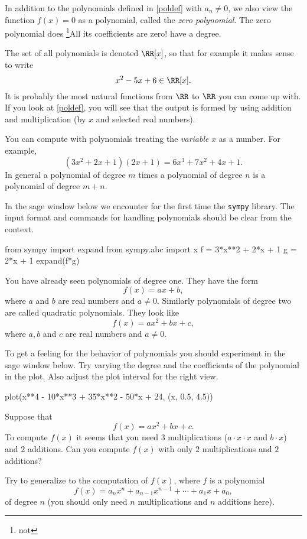 \documentclass{article}
\begin{document}
In addition to the polynomials defined in \eqref{poldef} with $a_n\neq 0$,
we also view the function $f(x) = 0$ as a polynomial, called the \emph{zero polynomial}.
The zero polynomial does \footnote{not}{All its coefficients are zero!} have a degree.

The set of all polynomials is denoted
$\RR[x]$, so that for example it makes sense to write
$$
x^2 - 5 x + 6\in \RR[x].
$$
It is probably the most natural functions from $\RR$ to $\RR$ you can come up with.
If you look at \eqref{poldef}, you will see that the output is formed by using
addition and multiplication (by $x$ and selected real numbers).



You can compute with polynomials treating the \emph{variable} $x$ as
a number. For example,
$$
(3 x^2 + 2 x + 1) (2 x + 1) = 6 x^3 + 7 x^2 + 4 x + 1.
$$
In general a polynomial of degree $m$ times a polynomial of degree $n$ is a
polynomial of degree $m+n$.


In the sage window below we encounter for the first time the \texttt{sympy} library. The
input format and commands for handling polynomials should be clear from the context.

\begin{sage}
from sympy import expand
from sympy.abc import x
f = 3*x**2 + 2*x + 1
g = 2*x + 1
expand(f*g)
\end{sage}


You have already seen polynomials
of degree one. They have the form
$$
f(x) = a x + b,
$$
where $a$ and $b$ are real numbers and $a\neq 0$. Similarly
polynomials of degree two are called quadratic polynomials. They look
like
$$
f(x) = a x^2 + b x + c,
$$
where $a, b$ and $c$ are real numbers and $a\neq 0$. 

To get a feeling for the behavior of polynomials you should experiment in the sage
window below. Try varying the degree and the coefficients of the polynomial in the plot.
Also adjust the plot interval for the right view.

\begin{sage}
  plot(x**4 - 10*x**3 + 35*x**2 - 50*x + 24, (x, 0.5, 4.5))
\end{sage}

\beginshex
Suppose that
$$
f(x) = a x^2 + b x + c.
$$
To compute $f(x)$ it seems that you need $3$ multiplications
($a\cdot x\cdot x$ and $b\cdot x$) and $2$ additions.
Can you compute $f(x)$ with only $2$ multiplications and $2$ additions?

Try to generalize to the computation of $f(x)$, where $f$ is a polynomial
$$
f(x) = a_n x^n + a_{n-1} x^{n-1} + \cdots + a_1 x + a_0,
$$
of degree $n$ (you should only need $n$ multiplications and $n$ additions here).
\endshex
\end{document}
